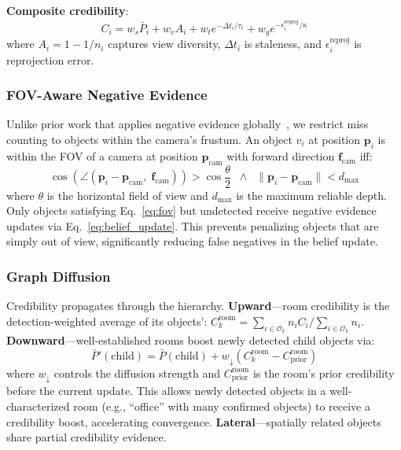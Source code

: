 \documentclass[conference]{IEEEtran}
\newcommand{\vp}{\mathbf{p}}
\newcommand{\vf}{\mathbf{f}}
\begin{document}
\textbf{Composite credibility}:
\begin{equation}
C_i = w_s \bar{P}_i + w_v A_i + w_t e^{-\Delta t_i / \tau_t} + w_g e^{-\epsilon_i^{\text{reproj}} / \kappa}
\label{eq:credibility}
\end{equation}
where $A_i = 1 - 1/n_i$ captures view diversity, $\Delta t_i$ is staleness, and $\epsilon_i^{\text{reproj}}$ is reprojection error.

\subsubsection{FOV-Aware Negative Evidence}

Unlike prior work that applies negative evidence globally~\cite{sgnav2024}, we restrict miss counting to objects within the camera's frustum.
An object $v_i$ at position $\vp_i$ is within the FOV of a camera at position $\vp_{\text{cam}}$ with forward direction $\vf_{\text{cam}}$ iff:
\begin{equation}
\cos\!\left(\angle(\vp_i - \vp_{\text{cam}},\; \vf_{\text{cam}})\right) > \cos\!\frac{\theta}{2}
\;\;\wedge\;\;
\|\vp_i - \vp_{\text{cam}}\| < d_{\max}
\label{eq:fov}
\end{equation}
where $\theta$ is the horizontal field of view and $d_{\max}$ is the maximum reliable depth.
Only objects satisfying Eq.~\eqref{eq:fov} but undetected receive negative evidence updates via Eq.~\eqref{eq:belief_update}.
This prevents penalizing objects that are simply out of view, significantly reducing false negatives in the belief update.

\subsubsection{Graph Diffusion}

Credibility propagates through the hierarchy.
\textbf{Upward}---room credibility is the detection-weighted average of its objects':
$C_k^{\text{room}} = \sum_{i \in \mathcal{O}_k} n_i C_i \big/ \sum_{i \in \mathcal{O}_k} n_i$.
\textbf{Downward}---well-established rooms boost newly detected child objects via:
\begin{equation}
\bar{P}'(\text{child}) = \bar{P}(\text{child}) + w_{\downarrow}\!\left(C_k^{\text{room}} - C_{\text{prior}}^{\text{room}}\right)
\label{eq:diffusion}
\end{equation}
where $w_{\downarrow}$ controls the diffusion strength and $C_{\text{prior}}^{\text{room}}$ is the room's prior credibility before the current update.
This allows newly detected objects in a well-characterized room (e.g., ``office'' with many confirmed objects) to receive a credibility boost, accelerating convergence.
\textbf{Lateral}---spatially related objects share partial credibility evidence.
\end{document}

